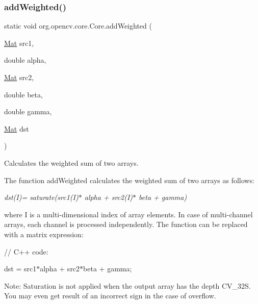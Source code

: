\subsubsection{\texorpdfstring{add\+Weighted()}{addWeighted()}\hspace{0.1cm}{\footnotesize\ttfamily [2/2]}}
{\footnotesize\ttfamily static void org.\+opencv.\+core.\+Core.\+add\+Weighted (\begin{DoxyParamCaption}\item[{\mbox{\hyperlink{classorg_1_1opencv_1_1core_1_1_mat}{Mat}}}]{src1,  }\item[{double}]{alpha,  }\item[{\mbox{\hyperlink{classorg_1_1opencv_1_1core_1_1_mat}{Mat}}}]{src2,  }\item[{double}]{beta,  }\item[{double}]{gamma,  }\item[{\mbox{\hyperlink{classorg_1_1opencv_1_1core_1_1_mat}{Mat}}}]{dst }\end{DoxyParamCaption})\hspace{0.3cm}{\ttfamily [static]}}

Calculates the weighted sum of two arrays.

The function {\ttfamily add\+Weighted} calculates the weighted sum of two arrays as follows\+:

{\itshape dst(\+I)= saturate(src1(\+I)$\ast$ alpha + src2(\+I)$\ast$ beta + gamma)}

where {\ttfamily I} is a multi-\/dimensional index of array elements. In case of multi-\/channel arrays, each channel is processed independently. The function can be replaced with a matrix expression\+: {\ttfamily }

{\ttfamily }

{\ttfamily }

{\ttfamily // C++ code\+:}

{\ttfamily }

{\ttfamily }

{\ttfamily dst = src1$\ast$alpha + src2$\ast$beta + gamma;}

{\ttfamily }

{\ttfamily }

{\ttfamily Note\+: Saturation is not applied when the output array has the depth {\ttfamily C\+V\+\_\+32S}. You may even get result of an incorrect sign in the case of overflow. }


